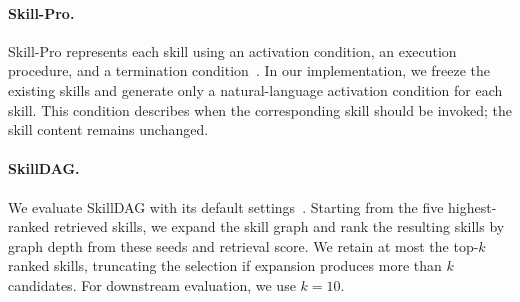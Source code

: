 \paragraph{Skill-Pro.}
Skill-Pro represents each skill using an activation condition, an execution procedure, and a termination condition~\citep{pmlr-v306-mi26d}. In our implementation, we freeze the existing skills and generate only a natural-language activation condition for each skill. This condition describes when the corresponding skill should be invoked; the skill content remains unchanged.

\paragraph{SkillDAG.}
We evaluate SkillDAG with its default settings~\citep{bai2026skilldag}. Starting from the five highest-ranked retrieved skills, we expand the skill graph and rank the resulting skills by graph depth from these seeds and retrieval score. We retain at most the top-$k$ ranked skills, truncating the selection if expansion produces more than $k$ candidates. For downstream evaluation, we use $k=10$.


